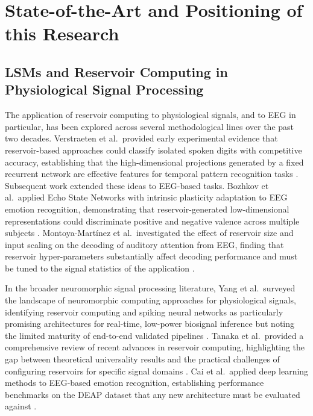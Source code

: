 \section{State-of-the-Art and Positioning of this Research}
\label{sec:state_of_art}

\subsection{LSMs and Reservoir Computing in Physiological Signal Processing}
\label{sec:lsm_literature}
The application of reservoir computing to physiological signals, and to EEG in particular, has been explored across several methodological lines over the past two decades. Verstraeten et al.\ provided early experimental evidence that reservoir-based approaches could classify isolated spoken digits with competitive accuracy, establishing that the high-dimensional projections generated by a fixed recurrent network are effective features for temporal pattern recognition tasks \cite{verstraeten_experimental_2007}. Subsequent work extended these ideas to EEG-based tasks. Bozhkov et al.\ applied Echo State Networks with intrinsic plasticity adaptation to EEG emotion recognition, demonstrating that reservoir-generated low-dimensional representations could discriminate positive and negative valence across multiple subjects \cite{bozhkov_reservoir_2017}. Montoya-Mart\'{i}nez et al.\ investigated the effect of reservoir size and input scaling on the decoding of auditory attention from EEG, finding that reservoir hyper-parameters substantially affect decoding performance and must be tuned to the signal statistics of the application \cite{montoya-martinez_effect_2021}.

In the broader neuromorphic signal processing literature, Yang et al.\ surveyed the landscape of neuromorphic computing approaches for physiological signals, identifying reservoir computing and spiking neural networks as particularly promising architectures for real-time, low-power biosignal inference but noting the limited maturity of end-to-end validated pipelines \cite{yang_neuromorphic_2023}. Tanaka et al.\ provided a comprehensive review of recent advances in reservoir computing, highlighting the gap between theoretical universality results and the practical challenges of configuring reservoirs for specific signal domains \cite{tanaka_recent_2019}. Cai et al.\ applied deep learning methods to EEG-based emotion recognition, establishing performance benchmarks on the DEAP dataset that any new architecture must be evaluated against \cite{cai_eeg-based_2024}.


